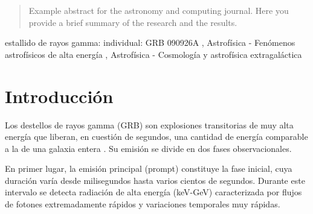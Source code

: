 \documentclass[final,5p,times,twocolumn,authoryear]{elsarticle}
\begin{document}
\begin{frontmatter}
\begin{abstract}
Example abstract for the astronomy and computing journal. Here you provide a brief summary of the research and the results.
\end{abstract}



\begin{keyword}
estallido de rayos gamma: individual: GRB 090926A \sep
Astrofísica - Fenómenos astrofísicos de alta energía \sep
Astrofísica - Cosmología y astrofísica extragaláctica





\end{keyword}


\end{frontmatter}




\section{Introducción}
\label{introduction}

Los destellos de rayos gamma (GRB) son explosiones transitorias de muy alta energía que liberan, en cuestión de segundos, una cantidad de energía comparable a la de una galaxia entera \citep{carroll2017}.  Su emisión se divide en dos fases observacionales.

En primer lugar, la emisión principal (prompt) constituye la fase inicial, cuya duración varía desde milisegundos hasta varios cientos de segundos.  Durante este intervalo se detecta radiación de alta energía (keV-GeV) caracterizada por flujos de fotones extremadamente rápidos y variaciones temporales muy rápidas.
\end{document}
